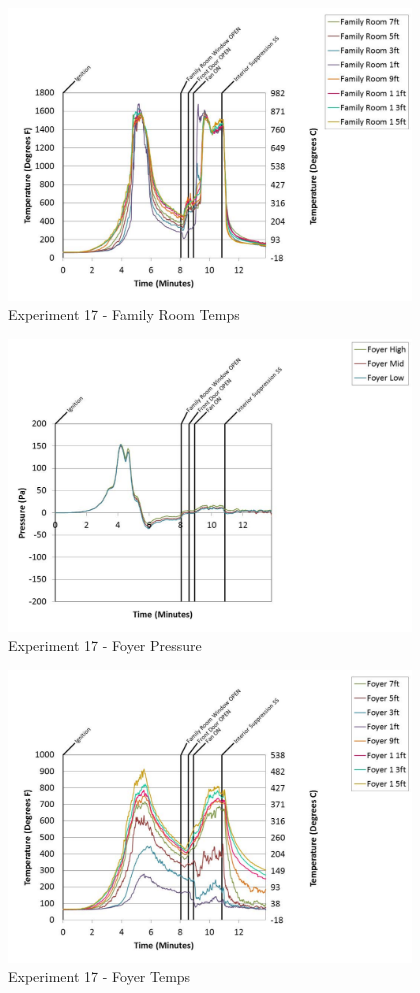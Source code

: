 \documentclass{article}
\begin{document}
\begin{appendices}
	\clearpage

	\begin{figure}[h!]
		\centering
		\includegraphics[height=3.05in]{0_Images/Results_Charts/Exp_17_Charts/FamilyRoomTemps.pdf}
		\caption{Experiment 17 - Family Room Temps}
	\end{figure}
 

	\begin{figure}[h!]
		\centering
		\includegraphics[height=3.05in]{0_Images/Results_Charts/Exp_17_Charts/FoyerPressure.pdf}
		\caption{Experiment 17 - Foyer Pressure}
	\end{figure}
 
	\clearpage

	\begin{figure}[h!]
		\centering
		\includegraphics[height=3.05in]{0_Images/Results_Charts/Exp_17_Charts/FoyerTemps.pdf}
		\caption{Experiment 17 - Foyer Temps}
	\end{figure}
 


\end{appendices}
\end{document}
